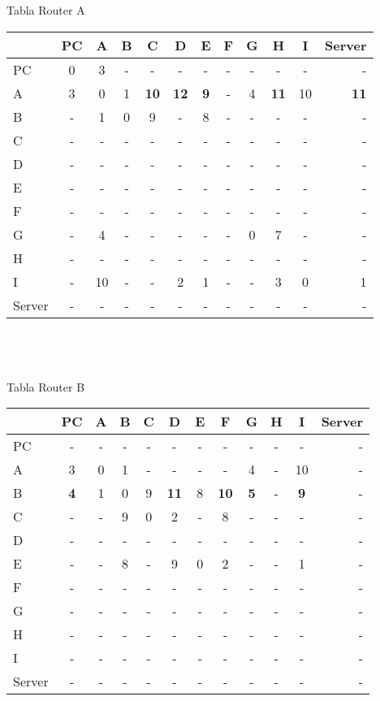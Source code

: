 \documentclass{article}
\begin{document}
\\
\\
Tabla Router A  \\
\begin{tabular}{l*{10}{c}r}
              & PC & A & B & C & D & E & F & G & H & I & Server \\
\hline
PC             & 0 & 3 & - & - & - & - & - & - & - & - & - \\
A              & 3 & 0 & 1 &\bf{10}&\bf{12}&\bf{9}& - & 4 &\bf{11}& 10 & \bf{11}\\
B              & - & 1 & 0 & 9 & - & 8 & - & - & - & - & -\\
C              & - & - & - & - & - & - & - & - & - & - & -\\
D              & - & - & - & - & - & - & - & - & - & - & -\\
E              & - & - & - & - & - & - & - & - & - & - & -\\
F              & - & - & - & - & - & - & - & - & - & - & -\\
G              & - & 4 & - & - & - & - & - & 0 & 7 & - & -\\
H              & - & - & - & - & - & - & - & - & - & - & -\\
I              & - & 10 & - & - & 2 & 1 & - & - & 3 & 0 & 1\\
Server         & - & - & - & - & - & - & - & - & - & - & -\\

\end{tabular}
\\\\
\\
Tabla Router B \\
\begin{tabular}{l*{10}{c}r}
              & PC & A & B & C & D & E & F & G & H & I & Server \\
\hline
PC             & - & - & - & - & - & - & - & - & - & - & -\\
A              & 3 & 0 & 1 & - & - & - & - & 4 & - & 10 & -\\
B              &\bf{4}& 1 & 0 & 9 &\bf{11}& 8 &\bf{10}&\bf{5}& - &\bf{9}& -\\
C              & - & - & 9 & 0 & 2 & - & 8 & - & - & - & -\\
D              & - & - & - & - & - & - & - & - & - & - & -\\
E              & - & - & 8 & - & 9 & 0 & 2 & - & - & 1 & -\\
F              & - & - & - & - & - & - & - & - & - & - & -\\
G              & - & - & - & - & - & - & - & - & - & - & -\\
H              & - & - & - & - & - & - & - & - & - & - & -\\
I              & - & - & - & - & - & - & - & - & - & - & -\\
Server         & - & - & - & - & - & - & - & - & - & - & -\\

\end{tabular}
\end{document}
